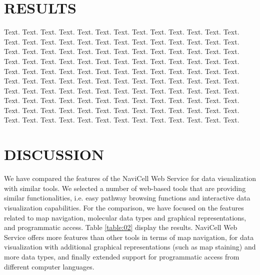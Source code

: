 \documentclass[a4,center,fleqn]{NAR}
\begin{document}
\section{RESULTS}

Text. Text. Text. Text. Text. Text. Text. Text. Text. Text. Text.
Text. Text. Text. Text. Text. Text. Text. Text. Text. Text. Text.
Text. Text. Text. Text. Text. Text. Text. Text. Text. Text. Text.
Text. Text. Text. Text. Text. Text. Text. Text. Text. Text. Text.
Text. Text. Text. Text. Text. Text. Text. Text. Text. Text. Text.
Text. Text. Text. Text. Text. Text. Text. Text. Text. Text. Text.
Text. Text. Text. Text. Text. Text. Text. Text. Text. Text. Text.
Text. Text. Text. Text. Text. Text. Text. Text. Text. Text. Text.
Text. Text. Text. Text. Text. Text. Text. Text. Text. Text. Text.
Text. Text. Text. Text. Text. Text. Text. Text. Text. Text. Text.
Text. Text. Text. Text. Text. Text. Text. Text. Text. Text. Text.
Text. Text. Text. Text. Text. Text. Text. Text. Text.

\section{DISCUSSION}

We have compared the features of the NaviCell Web Service for data visualization
with similar tools. We selected a number of web-based tools that are providing
similar functionalities, i.e. easy pathway browsing functions and interactive data
visualization capabilities. For the comparison, we have focused on the features
related to map navigation, molecular data types and graphical representations,
and programmatic access. Table \ref{table:02} display the results. NaviCell Web
Service offers more features than other tools in terms of map navigation, for
data visualization with additional graphical representations (such as map
staining) and more data types, and finally extended support for programmatic
access from different computer languages.        
\end{document}
